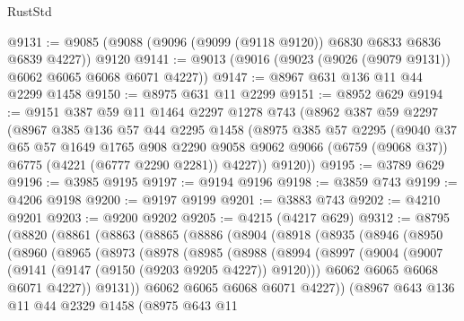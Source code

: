 \begin{lexlean}{RustStd}
\begin{coremodule}
@9131 := @9085 (@9088 (@9096 (@9099 (@9118 @9120)) @6830 @6833 @6836 @6839 @4227)) @9120
@9141 := @9013 (@9016 (@9023 (@9026 (@9079 @9131)) @6062 @6065 @6068 @6071 @4227))
@9147 := @8967 @631 @136 @11 @44 @2299 @1458
@9150 := @8975 @631 @11 @2299
@9151 := @8952 @629
@9194 := @9151
    @387
    @59
    @11
    @1464
    @2297
    @1278
    @743
    (@8962
      @387
      @59
      @2297
      (@8967
        @385
        @136
        @57
        @44
        @2295
        @1458
        (@8975
          @385
          @57
          @2295
          (@9040
            @37
            @65
            @57
            @1649
            @1765
            @908
            @2290
            @9058
            @9062
            @9066
            (@6759 (@9068 @37))
            @6775
            (@4221 (@6777 @2290 @2281))
            @4227))
        @9120))
@9195 := @3789 @629
@9196 := @3985 @9195
@9197 := @9194 @9196
@9198 := @3859 @743
@9199 := @4206 @9198
@9200 := @9197 @9199
@9201 := @3883 @743
@9202 := @4210 @9201
@9203 := @9200 @9202
@9205 := @4215 (@4217 @629)
@9312 := @8795
    (@8820
      (@8861
        (@8863
          (@8865
            (@8886
              (@8904
                (@8918
                  (@8935
                    (@8946
                      (@8950
                        (@8960
                          (@8965
                            (@8973
                              (@8978
                                (@8985
                                  (@8988
                                    (@8994
                                      (@8997
                                        (@9004
                                          (@9007 (@9141 (@9147 (@9150 (@9203 @9205 @4227)) @9120)))
                                          @6062
                                          @6065
                                          @6068
                                          @6071
                                          @4227))
                                      @9131))
                                  @6062
                                  @6065
                                  @6068
                                  @6071
                                  @4227))
                              (@8967
                                @643
                                @136
                                @11
                                @44
                                @2329
                                @1458
                                (@8975
                                  @643
                                  @11

\end{coremodule}
\end{lexlean}
